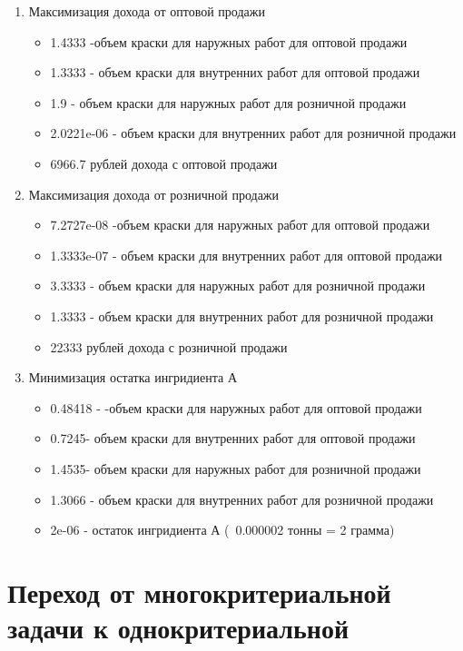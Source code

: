 \documentclass[14pt,a4paper,report]{report}
\begin{document}
\begin{enumerate}
    \item Максимизация дохода от оптовой продажи
    \begin{itemize}
        \item 1.4333 -объем краски  для наружных работ для оптовой продажи 
        \item 1.3333 - объем краски  для внутренних работ для оптовой продажи 
        \item 1.9 -  объем краски для наружных работ для розничной продажи
        \item 2.0221e-06 - объем краски  для внутренних работ для розничной продажи
        \item 6966.7 рублей дохода с оптовой продажи
    \end{itemize}
        \item Максимизация дохода от розничной продажи
            \begin{itemize}
        \item 7.2727e-08 -объем краски  для наружных работ для оптовой продажи 
        \item 1.3333e-07 - объем краски  для внутренних работ для оптовой продажи 
        \item 3.3333 -  объем краски для наружных работ для розничной продажи
        \item  1.3333 - объем краски  для внутренних работ для розничной продажи
        \item 22333 рублей дохода с розничной продажи
    \end{itemize}
    \item Минимизация остатка ингридиента А
    \begin{itemize}
        \item    0.48418 - -объем краски  для наружных работ для оптовой продажи 
        \item    0.7245- объем краски  для внутренних работ для оптовой продажи 
        \item 1.4535-  объем краски для наружных работ для розничной продажи
        \item   1.3066 - объем краски  для внутренних работ для розничной продажи
        \item 2e-06 - остаток ингридиента А (~0.000002 тонны = 2 грамма)
    \end{itemize}


\end{enumerate}

\section{Переход от многокритериальной задачи к однокритериальной}
\end{document}
